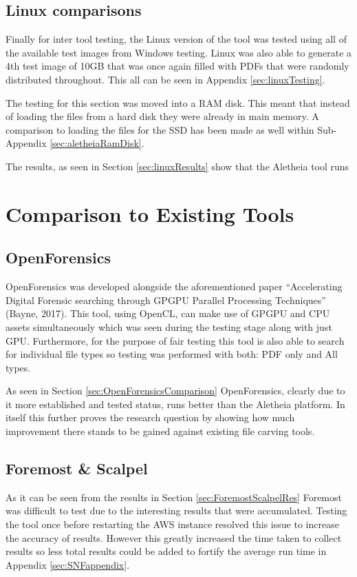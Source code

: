 \subsection{Linux comparisons}
Finally for inter tool testing, the Linux version of the tool was tested using all of the available test images from Windows testing.
Linux was also able to generate a 4th test image of 10GB that was once again filled with PDFs that were randomly distributed throughout.
This all can be seen in Appendix \ref{sec:linuxTesting}.

The testing for this section was moved into a RAM disk.
This meant that instead of loading the files from a hard disk they were already in main memory.
A comparison to loading the files for the \ac{SSD} has been made as well within Sub-Appendix \ref{sec:aletheiaRamDisk}.

The results, as seen in Section \ref{sec:linuxResults} show that the Aletheia tool runs
\newpage
\section{Comparison to Existing Tools} %
\label{sec:existingTools}

\subsection{OpenForensics}
\label{sec:OpenForensicsDiscussion}
OpenForensics was developed alongside the aforementioned paper ``Accelerating Digital Forensic searching through \ac{GPGPU} Parallel Processing Techniques'' (Bayne, 2017).
This tool, using OpenCL, can make use of \ac{GPGPU} and \ac{CPU} assets simultaneously which was seen during the testing stage along with just \ac{GPU}.
Furthermore, for the purpose of fair testing this tool is also able to search for individual file types so testing was performed with both: PDF only and All types.

As seen in Section \ref{sec:OpenForensicsComparison} OpenForensics, clearly due to it more established and tested status, runs better than the Aletheia platform.
In itself this further proves the research question by showing how much improvement there stands to be gained against existing file carving tools.

\subsection{Foremost \& Scalpel}
As it can be seen from the results in Section \ref{sec:ForemostScalpelRes} Foremost was difficult to test due to the interesting results that were accumulated.
Testing the tool once before restarting the \ac{AWS} instance resolved this issue to increase the accuracy of results.
However this greatly increased the time taken to collect results so less total results could be added to fortify the average run time in Appendix \ref{sec:SNFappendix}.

